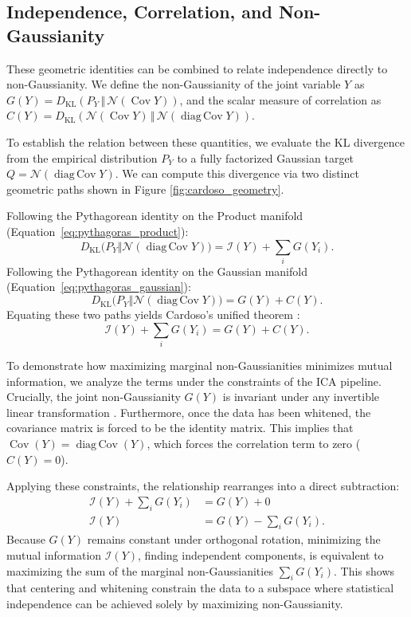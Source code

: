\documentclass[12pt,a4paper,twoside,openany]{book}
\begin{document}
\subsection{Independence, Correlation, and Non-Gaussianity}
These geometric identities can be combined to relate independence directly to non-Gaussianity. 
We define the non-Gaussianity of the joint variable $Y$ as $G(Y) = D_{\mathrm{KL}}(P_Y \,\Vert\, \mathcal{N}(\operatorname{Cov} Y))$, 
and the scalar measure of correlation as $C(Y) = D_{\mathrm{KL}}(\mathcal{N}(\operatorname{Cov} Y) \,\Vert\, \mathcal{N}(\operatorname{diag\,Cov} Y))$. 

To establish the relation between these quantities, we evaluate the KL divergence from the empirical distribution $P_Y$ 
to a fully factorized Gaussian target $Q = \mathcal{N}(\operatorname{diag\,Cov} Y)$. 
We can compute this divergence via two distinct geometric paths shown in Figure \ref{fig:cardoso_geometry}. 

Following the Pythagorean identity on the Product manifold (Equation~\ref{eq:pythagoras_product}):
\begin{equation}
    D_{\mathrm{KL}}\big(P_Y \Vert \mathcal{N}(\operatorname{diag\,Cov} Y)\big) = \mathscr{I}(Y) + \sum_{i} G(Y_i).
\end{equation}
Following the Pythagorean identity on the Gaussian manifold (Equation~\ref{eq:pythagoras_gaussian}):
\begin{equation}
    D_{\mathrm{KL}}\big(P_Y \Vert \mathcal{N}(\operatorname{diag\,Cov} Y)\big) = G(Y) + C(Y).
\end{equation}
Equating these two paths yields Cardoso's unified theorem \cite{cardoso2022}:
\begin{equation}
    \mathscr{I}(Y) + \sum_{i} G(Y_i) = G(Y) + C(Y).
\end{equation}

To demonstrate how maximizing marginal non-Gaussianities minimizes mutual information, we analyze the terms under 
the constraints of the ICA pipeline. Crucially, the joint non-Gaussianity $G(Y)$ is invariant under any invertible 
linear transformation \cite{cardoso2022}. Furthermore, once the data has been whitened, the covariance matrix is forced to be the identity matrix. 
This implies that $\operatorname{Cov}(Y) = \operatorname{diag\,Cov}(Y)$, which forces the correlation term to zero ($C(Y) = 0$). 

Applying these constraints, the relationship rearranges into a direct subtraction:
\begin{align}
    \mathscr{I}(Y) + \sum_{i} G(Y_i) &= G(Y) + 0 \nonumber \\
    \mathscr{I}(Y) &= G(Y) - \sum_{i} G(Y_i).
\end{align}
Because $G(Y)$ remains constant under orthogonal rotation, minimizing the mutual information $\mathscr{I}(Y)$, finding independent components, 
is equivalent to maximizing the sum of the marginal non-Gaussianities $\sum_i G(Y_i)$. 
This shows that centering and whitening constrain the data to a subspace where statistical 
independence can be achieved solely by maximizing non-Gaussianity.
\end{document}

